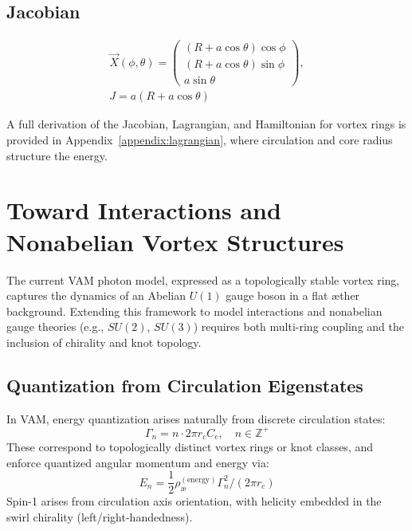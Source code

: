         \subsection{Jacobian}
        \begin{align}
            \vec{X}(\phi,\theta) =
            \begin{pmatrix}
            (R + a\cos\theta)\cos\phi \\
            (R + a\cos\theta)\sin\phi \\
            a\sin\theta
            \end{pmatrix}, \\
            J = a(R + a\cos\theta)
        \end{align}

        A full derivation of the Jacobian, Lagrangian, and Hamiltonian for vortex rings is provided in Appendix~\ref{appendix:lagrangian}, where circulation and core radius structure the energy.

\section{Toward Interactions and Nonabelian Vortex Structures}\label{sec:nonabelian}

        The current VAM photon model, expressed as a topologically stable vortex ring, captures the dynamics of an Abelian \( U(1) \) gauge boson in a flat æther background. Extending this framework to model interactions and nonabelian gauge theories (e.g., \( SU(2) \), \( SU(3) \)) requires both multi-ring coupling and the inclusion of chirality and knot topology.

        \subsection{Quantization from Circulation Eigenstates}

            In VAM, energy quantization arises naturally from discrete circulation states:
            \[
                \Gamma_n = n \cdot 2\pi r_c C_e, \quad n \in \mathbb{Z}^+
            \]
            These correspond to topologically distinct vortex rings or knot classes, and enforce quantized angular momentum and energy via:
            \[
                E_n = \frac{1}{2} \rho_\text{\ae}^{(\text{energy})} \Gamma_n^2 / (2\pi r_c)
            \]
            Spin-1 arises from circulation axis orientation, with helicity embedded in the swirl chirality (left/right-handedness).

